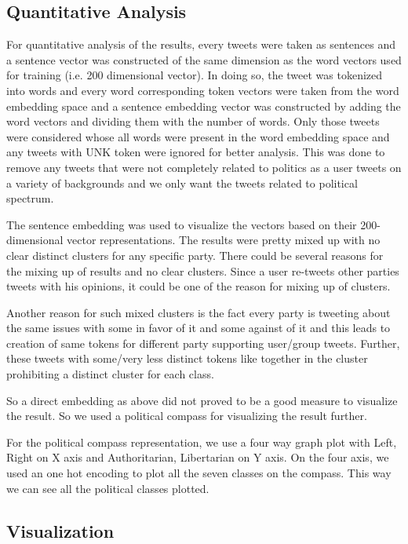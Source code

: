 \documentclass[10pt, oneside]{article}
\begin{document}
\begin{multicols}{2}
\section{Quantitative Analysis}

For quantitative analysis of the results, every tweets were taken as sentences and a sentence vector was constructed of the same dimension as the word vectors used for training (i.e. 200 dimensional vector). In doing so, the tweet was tokenized into words and every word corresponding token vectors were taken from the word embedding space and a sentence embedding vector was constructed by adding the word vectors and dividing them with the number of words. Only those tweets were considered whose all words were present in the word embedding space and any tweets with UNK token were ignored for better analysis. This was done to remove any tweets that were not completely related to politics as a user tweets on a variety of backgrounds and we only want the tweets related to political spectrum. 

The sentence embedding was used to visualize the vectors based on their 200-dimensional vector representations. The results were pretty mixed up with no clear distinct clusters for any specific party. There could be several reasons for the mixing up of results and no clear clusters. Since a user re-tweets other parties tweets with his opinions, it could be one of the reason for mixing up of clusters. 

Another reason for such mixed clusters is the fact every party is tweeting about the same issues with some in favor of it and some against of it and this leads to creation of same tokens for different party supporting user/group tweets. Further, these tweets with some/very less distinct tokens like together in the cluster prohibiting a distinct cluster for each class.

So a direct embedding as above did not proved to be a good measure to visualize the result. So we used a political compass \cite{PoliticalCompass} for visualizing the result further. 

For the political compass representation, we use a four way graph plot with Left, Right on X axis and Authoritarian, Libertarian on Y axis. On the four axis, we used an one hot encoding to plot all the seven classes on the compass. This way we can see all the political classes plotted. 

\subsection{Visualization}


\end{multicols}
\end{document}
